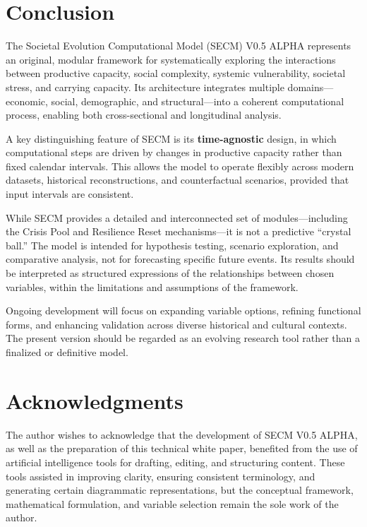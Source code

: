 \documentclass[12pt,a4paper]{article}
\begin{document}
\section{Conclusion}

The Societal Evolution Computational Model (SECM) V0.5 ALPHA represents an original, modular framework for systematically exploring the interactions between productive capacity, social complexity, systemic vulnerability, societal stress, and carrying capacity.  
Its architecture integrates multiple domains—economic, social, demographic, and structural—into a coherent computational process, enabling both cross-sectional and longitudinal analysis.

A key distinguishing feature of SECM is its \textbf{time-agnostic} design, in which computational steps are driven by changes in productive capacity rather than fixed calendar intervals. This allows the model to operate flexibly across modern datasets, historical reconstructions, and counterfactual scenarios, provided that input intervals are consistent.

While SECM provides a detailed and interconnected set of modules—including the Crisis Pool and Resilience Reset mechanisms—it is not a predictive “crystal ball.” The model is intended for hypothesis testing, scenario exploration, and comparative analysis, not for forecasting specific future events.  
Its results should be interpreted as structured expressions of the relationships between chosen variables, within the limitations and assumptions of the framework.

Ongoing development will focus on expanding variable options, refining functional forms, and enhancing validation across diverse historical and cultural contexts. The present version should be regarded as an evolving research tool rather than a finalized or definitive model.
\section{Acknowledgments}

The author wishes to acknowledge that the development of SECM V0.5 ALPHA, as well as the preparation of this technical white paper, benefited from the use of artificial intelligence tools for drafting, editing, and structuring content.  
These tools assisted in improving clarity, ensuring consistent terminology, and generating certain diagrammatic representations, but the conceptual framework, mathematical formulation, and variable selection remain the sole work of the author.
\end{document}

